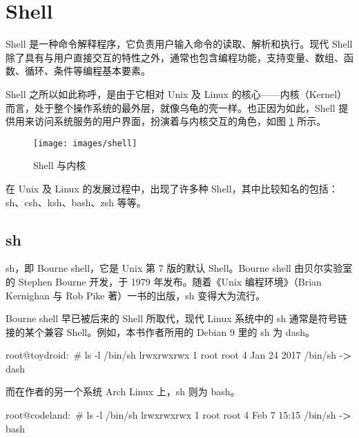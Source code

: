 \documentclass[]{ctexbook}
\newenvironment{Shaded}{\begin{snugshade}}{\end{snugshade}}
\newcommand{\ExtensionTok}[1]{#1}
\newcommand{\NormalTok}[1]{#1}
\newcommand{\OperatorTok}[1]{\textcolor[rgb]{0.81,0.36,0.00}{\textbf{#1}}}
\begin{document}
\hypertarget{shell}{%
\section{Shell}\label{shell}}

Shell 是一种命令解释程序，它负责用户输入命令的读取、解析和执行。现代 Shell 除了具有与用户直接交互的特性之外，通常也包含编程功能，支持变量、数组、函数、循环、条件等编程基本要素。

Shell 之所以如此称呼，是由于它相对 Unix 及 Linux 的核心------内核（Kernel）而言，处于整个操作系统的最外层，就像乌龟的壳一样。也正因为如此，Shell 提供用来访问系统服务的用户界面，扮演着与内核交互的角色，如图 \ref{fig:shell} 所示。

\begin{figure}

{\centering \texttt{[image: images/shell]} 

}

\caption{Shell 与内核}\label{fig:shell}
\end{figure}

在 Unix 及 Linux 的发展过程中，出现了许多种 Shell，其中比较知名的包括：sh、csh、ksh、bash、zsh 等等。

\hypertarget{sh}{%
\subsection{sh}\label{sh}}

sh，即 Bourne shell，它是 Unix 第 7 版的默认 Shell。Bourne shell 由贝尔实验室的 Stephen Bourne 开发，于 1979 年发布。随着《Unix 编程环境》（Brian Kernighan 与 Rob Pike 著）一书的出版，sh 变得大为流行。

Bourne shell 早已被后来的 Shell 所取代，现代 Linux 系统中的 sh 通常是符号链接的某个兼容 Shell。例如，本书作者所用的 Debian 9 里的 sh 为 dash。

\begin{Shaded}
\begin{Highlighting}[]
\ExtensionTok{root@toydroid}\NormalTok{:~# ls -l /bin/sh}
\ExtensionTok{lrwxrwxrwx}\NormalTok{ 1 root root 4 Jan 24  2017 /bin/sh -}\OperatorTok{>}\NormalTok{ dash}
\end{Highlighting}
\end{Shaded}

而在作者的另一个系统 Arch Linux 上，sh 则为 bash。

\begin{Shaded}
\begin{Highlighting}[]
\ExtensionTok{root@codeland}\NormalTok{:~# ls -l /bin/sh}
\ExtensionTok{lrwxrwxrwx}\NormalTok{ 1 root root 4 Feb  7 15:15 /bin/sh -}\OperatorTok{>}\NormalTok{ bash}
\end{Highlighting}
\end{Shaded}
\end{document}
